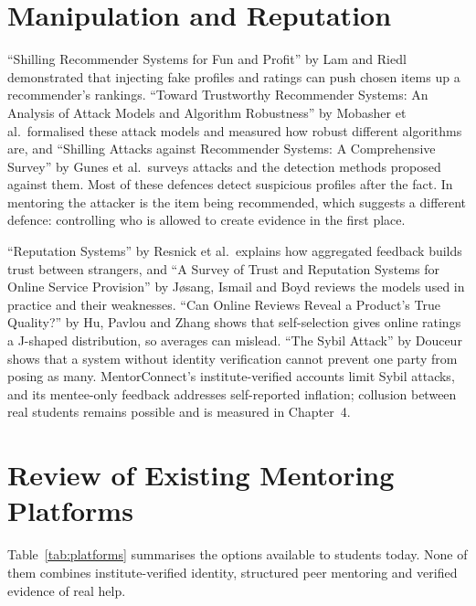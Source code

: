 \documentclass[12pt,a4paper]{report}
\begin{document}
\section{Manipulation and Reputation}
``Shilling Recommender Systems for Fun and Profit'' \cite{lam2004} by Lam and Riedl demonstrated that injecting fake profiles and ratings can push chosen items up a recommender's rankings. ``Toward Trustworthy Recommender Systems: An Analysis of Attack Models and Algorithm Robustness'' \cite{mobasher2007} by Mobasher et al.\ formalised these attack models and measured how robust different algorithms are, and ``Shilling Attacks against Recommender Systems: A Comprehensive Survey'' \cite{gunes2014} by Gunes et al.\ surveys attacks and the detection methods proposed against them. Most of these defences detect suspicious profiles after the fact. In mentoring the attacker is the item being recommended, which suggests a different defence: controlling who is allowed to create evidence in the first place.

``Reputation Systems'' \cite{resnick2000} by Resnick et al.\ explains how aggregated feedback builds trust between strangers, and ``A Survey of Trust and Reputation Systems for Online Service Provision'' \cite{josang2007} by J{\o}sang, Ismail and Boyd reviews the models used in practice and their weaknesses. ``Can Online Reviews Reveal a Product's True Quality?'' \cite{hu2006} by Hu, Pavlou and Zhang shows that self-selection gives online ratings a J-shaped distribution, so averages can mislead. ``The Sybil Attack'' \cite{douceur2002} by Douceur shows that a system without identity verification cannot prevent one party from posing as many. MentorConnect's institute-verified accounts limit Sybil attacks, and its mentee-only feedback addresses self-reported inflation; collusion between real students remains possible and is measured in Chapter~4.

\section{Review of Existing Mentoring Platforms}
Table~\ref{tab:platforms} summarises the options available to students today. None of them combines institute-verified identity, structured peer mentoring and verified evidence of real help.
\end{document}
